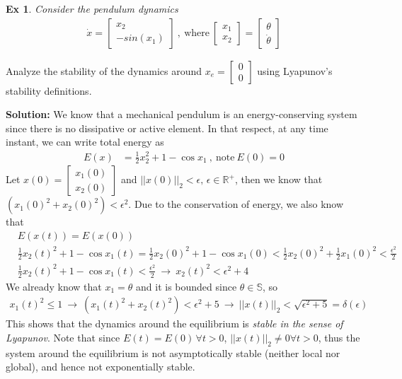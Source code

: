 \documentclass[twoside]{article}
\newtheorem{exmp}[theorem]{Ex}
\begin{document}
\begin{exmp}
    Consider the pendulum dynamics
    \begin{align*}
    \dot{x} = \begin{bmatrix} x_2 \\ -sin(x_1)\end{bmatrix} \ , \ \mathrm{where} \ \begin{bmatrix} x_1 \\ x_2 \end{bmatrix} = \begin{bmatrix}  \theta \\ \dot{\theta} \end{bmatrix}
\end{align*}
\end{exmp}
Analyze the stability of the dynamics around $x_e = \begin{bmatrix} 0 \\ 0 \end{bmatrix}$ using Lyapunov's stability definitions.

\textbf{Solution:} We know that a mechanical pendulum is an
energy-conserving system since there is no dissipative or active element. In that respect, at any time instant, we can write total energy as 
%
\begin{align*}
E(x) &= \frac{1}{2} x_2^2 + 1 - \cos{x_1}  \ , \ \mathrm{note} \ E(0) = 0
\end{align*}
%
Let $x(0) = \begin{bmatrix} x_1(0) \\ x_2(0) \end{bmatrix}$ and $|| x(0) ||_2 < \epsilon , \, \epsilon \in \mathbb{R}^+ $, then we know that $ (x_1(0)^2 + x_2(0)^2) < \epsilon^2 $. Due to the conservation of energy, we also know that
%
\begin{align*}
&E(x(t)) = E(x(0)) \\
&\frac{1}{2} x_2(t)^2 + 1 - \cos{x_1(t)} 
= 
\frac{1}{2} x_2(0)^2 + 1 - \cos{x_1(0)} < \frac{1}{2} x_2(0)^2 + \frac{1}{2} x_1(0)^2 < \frac{\epsilon^2}{2}
\\
&\frac{1}{2} x_2(t)^2 + 1 - \cos{x_1(t)} < \frac{\epsilon^2}{2} 
\ \rightarrow \ x_2(t)^2 < \epsilon^2 + 4
\end{align*}
%
We already know that $x_1 = \theta$ and it is bounded since $\theta \in \mathbb{S}$, so 
%
\begin{align*}
x_1(t)^2 \leq 1 \ \rightarrow \ ( x_1(t)^2 + x_2(t)^2 ) < \epsilon^2 + 5 \ \rightarrow \ || x(t) ||_2 < \sqrt{\epsilon^2 + 5} = \delta(\epsilon)
\end{align*}
%
This shows that the dynamics around the equilibrium is \textit{stable in the sense of Lyapunov}. Note that 
since $E(t) = E(0) \, \forall t >0$, $|| x(t) ||_2 \neq 0 \forall t >0$, thus the system around the equilibrium is not asymptotically stable (neither local nor global), and hence not exponentially stable. 
\end{document}
